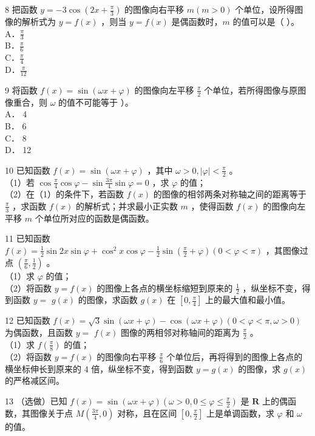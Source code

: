 \documentclass[10pt]{article}
\begin{document}
8 把函数 \(y=-3 \cos \left(2 x+\frac{\pi}{3}\right)\) 的图像向右平移 \(m(m>0)\) 个单位，设所得图像的解析式为 \(y=f(x)\) ，则当 \(y=f(x)\) 是偶函数时，\(m\) 的值可以是（ ）。\\
A．\(\frac{\pi}{3}\)\\
B．\(\frac{\pi}{6}\)\\
C．\(\frac{\pi}{4}\)\\
D．\(\frac{\pi}{12}\)

9 将函数 \(f(x)=\sin (\omega x+\varphi)\) 的图像向左平移 \(\frac{\pi}{2}\) 个单位，若所得图像与原图像重合，则 \(\omega\) 的值不可能等于 ）。\\
A． 4\\
B． 6\\
C． 8\\
D． 12

10 已知函数 \(f(x)=\sin (\omega x+\varphi)\) ，其中 \(\omega>0,|\varphi|<\frac{\pi}{2}\) 。\\
（1）若 \(\cos \frac{\pi}{4} \cos \varphi-\sin \frac{3 \pi}{4} \sin \varphi=0\) ，求 \(\varphi\) 的值；\\
（2）在（1）的条件下，若函数 \(f(x)\) 的图像的相邻两条对称轴之间的距离等于 \(\frac{\pi}{3}\) ，求函数 \(f(x)\) 的解析式；并求最小正实数 \(m\) ，使得函数 \(f(x)\) 的图像向左平移 \(m\) 个单位所对应的函数是偶函数。

11 已知函数 \(f(x)=\frac{1}{2} \sin 2 x \sin \varphi+\cos ^{2} x \cos \varphi-\frac{1}{2} \sin \left(\frac{\pi}{2}+\varphi\right)(0<\varphi<\pi)\) ，其图像过点 \(\left(\frac{\pi}{6}, \frac{1}{2}\right)\) 。\\
（1）求 \(\varphi\) 的值；\\
（2）将函数 \(y=f(x)\) 的图像上各点的横坐标缩短到原来的 \(\frac{1}{2}\) ，纵坐标不变，得到函数 \(y=\) \(g(x)\) 的图像，求函数 \(g(x)\) 在 \(\left[0, \frac{\pi}{4}\right]\) 上的最大值和最小值。

12 已知函数 \(f(x)=\sqrt{3} \sin (\omega x+\varphi)-\cos (\omega x+\varphi)(0<\varphi<\pi, \omega>0)\) 为偶函数，且函数 \(y=\) \(f(x)\) 图像的两相邻对称轴间的距离为 \(\frac{\pi}{2}\) 。\\
（1）求 \(f\left(\frac{\pi}{8}\right)\) 的值；\\
（2）将函数 \(y=f(x)\) 的图像向右平移 \(\frac{\pi}{6}\) 个单位后，再将得到的图像上各点的横坐标伸长到原来的 4 倍，纵坐标不变，得到函数 \(y=g(x)\) 的图像，求 \(g(x)\) 的严格减区间。

13 （选做）已知 \(f(x)=\sin (\omega x+\varphi)\left(\omega>0,0 \leqslant \varphi \leqslant \frac{\pi}{2}\right)\) 是 \(\mathbf{R}\) 上的偶函数，其图像关于点 \(M\left(\frac{3 \pi}{4}, 0\right)\) 对称，且在区间 \(\left[0, \frac{\pi}{2}\right]\) 上是单调函数，求 \(\varphi\) 和 \(\omega\) 的值。
\end{document}
